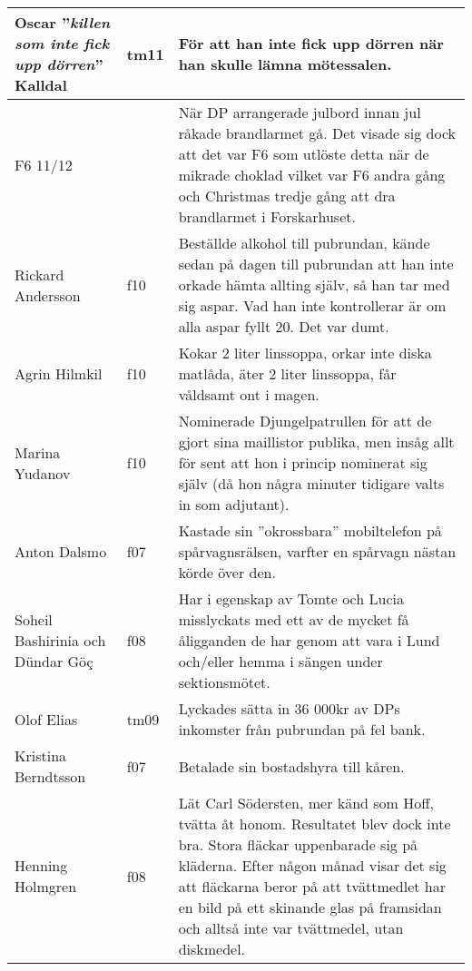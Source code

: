 \begin{longtable}{p{55mm}lp{60mm}}
Oscar ''\emph{killen som inte fick upp dörren}'' Kalldal & tm11 & För att han inte fick upp dörren när han skulle lämna mötessalen. \\ \hline

F6 11/12 &  & När DP arrangerade julbord innan jul råkade brandlarmet gå. Det visade sig dock att det var F6 som utlöste detta när de mikrade choklad vilket var F6 andra gång och Christmas tredje gång att dra brandlarmet i Forskarhuset. \\ \hline

Rickard Andersson & f10 & Beställde alkohol till pubrundan, kände sedan på dagen till pubrundan att han inte orkade hämta allting själv, så han tar med sig aspar. Vad han inte kontrollerar är om alla aspar fyllt 20. Det var dumt. \\ \hline


Agrin Hilmkil & f10 & Kokar 2 liter linssoppa, orkar inte diska matlåda, äter 2 liter linssoppa, får
våldsamt ont i magen. \\ \hline

Marina Yudanov & f10 & Nominerade Djungelpatrullen för att de gjort
sina maillistor publika, men insåg allt för sent att hon i princip
nominerat sig själv (då hon några minuter tidigare valts in som
adjutant). \\ \hline

  Anton Dalsmo & f07 & Kastade sin ''okrossbara'' mobiltelefon på
  spårvagnsrälsen, varfter en spårvagn nästan körde över den. \\ \hline
  
Soheil Bashirinia och Dündar Göç & f08 & Har i egenskap av Tomte och Lucia
misslyckats med ett av de mycket få åligganden de har genom att vara i
Lund och/eller hemma i sängen under sektionsmötet. \\ \hline

Olof Elias & tm09 & Lyckades sätta in 36 000kr av DPs inkomster från
pubrundan på fel bank. \\ \hline

Kristina Berndtsson & f07 & Betalade sin bostadshyra till
kåren. \\ \hline

Henning Holmgren & f08 & Lät Carl Södersten, mer känd som Hoff, tvätta
åt honom. Resultatet blev dock inte bra. Stora fläckar uppenbarade sig
på kläderna. Efter någon månad visar det sig att fläckarna beror på att
tvättmedlet har en bild på ett skinande glas på framsidan och alltså inte
var tvättmedel, utan diskmedel.\\ \hline


\end{longtable}
